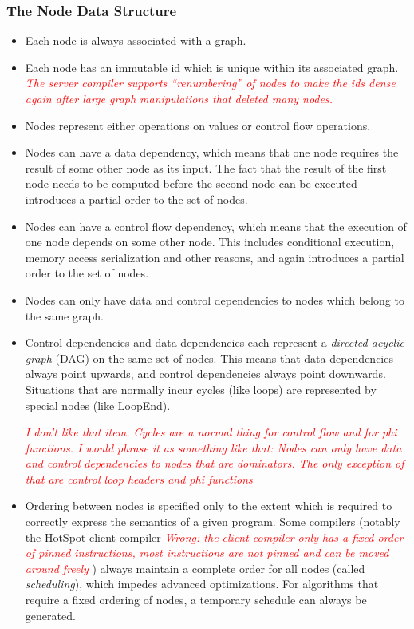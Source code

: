 \documentclass[twocolumn]{svjour3}
\newcommand{\mynote}[2]{
\textcolor{red}{\fbox{\bfseries\sffamily\scriptsize#1}
  {\small\textsf{\emph{#2}}}
\fbox{\bfseries\sffamily\scriptsize }}}
\newcommand\cw[1]{\mynote{CW}{#1}}
\begin{document}
\subsubsection{The Node Data Structure}
\begin{itemize}
    \item Each node is always associated with a graph.
    \item Each node has an immutable id which is unique within its associated graph. \cw{The server compiler supports ``renumbering'' of nodes to make the ids dense again after large graph manipulations that deleted many nodes.}
    \item Nodes represent either operations on values or control flow operations.
    \item Nodes can have a data dependency, which means that one node requires the result of some other node as its input. The fact that the result of the first node needs to be computed before the second node can be executed introduces a partial order to the set of nodes.
    \item Nodes can have a control flow dependency, which means that the execution of one node depends on some other node. This includes conditional execution, memory access serialization and other reasons, and again introduces a partial order to the set of nodes.
    \item Nodes can only have data and control dependencies to nodes which belong to the same graph.
    \item Control dependencies and data dependencies each represent a \emph{directed acyclic graph} (DAG) on the same set of nodes. This means that data dependencies always point upwards, and control dependencies always point downwards. Situations that are normally incur cycles (like loops) are represented by special nodes (like LoopEnd).
		\cw{I don't like that item.  Cycles are a normal thing for control flow and for phi functions.  I would phrase it as something like that: Nodes can only have data and control dependencies to nodes that are dominators.  The only exception of that are control loop headers and phi functions}
    \item Ordering between nodes is specified only to the extent which is required to correctly express the semantics of a given program. Some compilers (notably the HotSpot client compiler \cw{Wrong: the client compiler only has a fixed order of pinned instructions, most instructions are not pinned and can be moved around freely}) always maintain a complete order for all nodes (called \emph{scheduling}), which impedes advanced optimizations. For algorithms that require a fixed ordering of nodes, a temporary schedule can always be generated.

\end{itemize}
\end{document}
